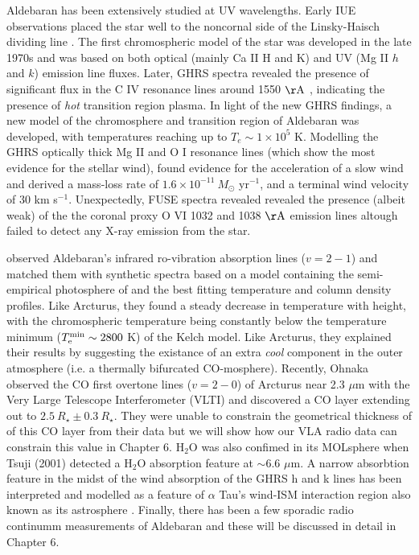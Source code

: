 Aldebaran has been extensively studied at UV wavelengths. Early IUE observations placed the star well to the noncornal side of the Linsky-Haisch dividing line \citep{linsky_1979}. The first chromospheric model of the star was developed in the late 1970s \citep{kelch_1978} and was based on both optical (mainly Ca II H and K) and UV (Mg II $h$ and $k$) emission line fluxes. Later, GHRS spectra revealed the presence of significant flux in the C IV resonance lines around 1550 $\rm{\AA}$ \citep{carpenter_1996}, indicating the presence of \textit{hot} transition region plasma. In light of the new GHRS findings, a new model of the chromosphere and transition region of Aldebaran was developed, with temperatures reaching up to $T_{e} \sim 1\times 10^5$ K. Modelling the GHRS optically thick Mg II and O I resonance lines (which show the most evidence for the stellar wind), \cite{robinson_1998} found evidence for the acceleration of a slow wind and derived a mass-loss rate of $1.6\times 10^{-11} \ M_{\odot}$ yr$^{-1}$, and a terminal wind velocity of 30 km s$^{-1}$. Unexpectedly, FUSE spectra revealed revealed the presence (albeit weak) of the the coronal proxy O VI 1032 and 1038 $\rm{\AA}$ emission lines \citep{dupree_2005} altough \cite{ayres_2003} failed to detect any X-ray emission from the star.

\cite{wiedemann_1994} observed Aldebaran's infrared ro-vibration absorption lines ($v=2-1$) and matched them with synthetic spectra based on a model containing the semi-empirical photosphere of \cite{kelch_1978} and the best fitting temperature and column density profiles. Like Arcturus, they found a steady decrease in temperature with height, with the chromospheric temperature being constantly below the temperature minimum ($T ^{\rm{min}} _{\rm{e}} \sim 2800$ K) of the Kelch model. Like Arcturus, they explained their results by suggesting the existance of an extra \textit{cool} component in the outer atmosphere (i.e. a thermally bifurcated  CO-mosphere). Recently, Ohnaka observed the CO first overtone lines ($v=2-0$) of Arcturus near 2.3 $\mu$m with the Very Large Telescope Interferometer (VLTI) and discovered a CO layer extending out to $2.5\ R_{\star} \pm 0.3 \ R_{\star}$. They were unable to constrain the geometrical thickness of of this CO layer from their data but we will show how our VLA radio data can constrain this value in Chapter 6. H$_{2}$O was also confimed in its MOLsphere  when Tsuji (2001) detected a H$_{2}$O absorption feature at $\sim6.6$ $\mu$m. A narrow absorbtion feature in the midst of the wind absorption of the GHRS  h  and k  lines has been interpreted and modelled as a feature of $\alpha$ Tau's wind-ISM interaction region also known as its astrosphere \citep{wood_2007}. Finally, there has been a few sporadic radio continumm measurements of Aldebaran and these will be discussed in detail in Chapter 6.

